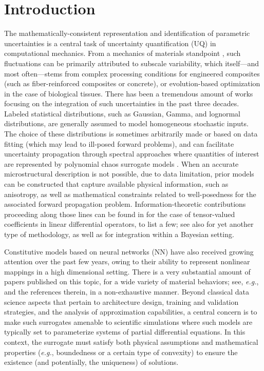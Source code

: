 \chapter{Introduction}
\label{chap:Introduction}

The mathematically-consistent representation and identification of parametric uncertainties is a central task of uncertainty quantification (UQ) in computational mechanics. From a mechanics of materials standpoint \cite{GUILLEMINOT2020385}, such fluctuations can be primarily attributed to subscale variability, which itself---and most often---stems from complex processing conditions for engineered composites (such as fiber-reinforced composites or concrete), or evolution-based optimization in the case of biological tissues. There has been a tremendous amount of works focusing on the integration of such uncertainties in the past three decades. Labeled statistical distributions, such as Gaussian, Gamma, and lognormal distributions, are generally assumed to model homogeneous stochastic inputs. The choice of these distributions is sometimes arbitrarily made or based on data fitting (which may lead to ill-posed forward problems), and can facilitate uncertainty propagation through spectral approaches \cite{Ghanem1991, OLM, Ghanem2017} where quantities of interest are represented by polynomial chaos surrogate models \cite{Wiener,Cameron,Xiu2002,Soize2004}. When an accurate microstructural description is not possible, due to data limitation, prior models can be constructed that capture available physical information, such as anisotropy, as well as mathematical constraints related to well-posedness for the associated forward propagation problem. Information-theoretic contributions proceeding along those lines can be found in \cite{Soize2006,Guilleminot-IJNME-2017,Guilleminot-SIAM-2013,STABER2017399} for the case of tensor-valued coefficients in linear differential operators, to list a few; see also \cite{Grigoriu2016} for yet another type of methodology, as well as \cite{SOIZE2011} for integration within a Bayesian setting.

Constitutive models based on neural networks (NN) have also received growing attention over the past few years, owing to their ability to represent nonlinear mappings in a high dimensional setting. There is a very substantial amount of papers published on this topic, for a wide variety of material behaviors; see, \textit{e.g.},  \cite{flaschel2021unsupervised,xu2021learning,holzapfel2021predictive,jung2006neural,ghaboussi1998autoprogressive,ghaboussi1998new,hashash2004numerical,furukawa1998implicit,joshi2022bayesian,as2022mechanics,Asad-IJNME,KLEIN2022104703} and the references therein, in a non-exhaustive manner. Beyond classical data science aspects that pertain to architecture design, training and validation strategies, and the analysis of approximation capabilities, a central concern is to make such surrogates amenable to scientific simulations where such models are typically set to parameterize systems of partial differential equations. In this context, the surrogate must satisfy both physical assumptions and mathematical properties (\textit{e.g.}, boundedness or a certain type of convexity) to ensure the existence (and potentially, the uniqueness) of solutions. 

